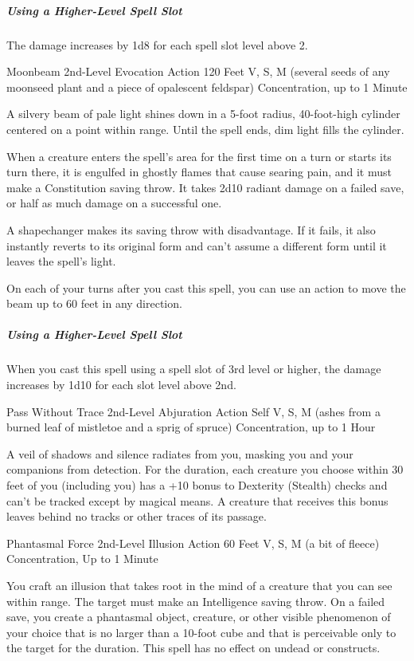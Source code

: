 \documentclass[letterpaper,openany,oneside,twocolumn]{book}
\begin{document}
\subparagraph*{Using a Higher-Level Spell Slot} The damage increases by 1d8 for each spell slot level above 2.
  
\DndSpellHeader
  {Moonbeam}
  {2nd-Level Evocation}
  {Action}
  {120 Feet}
  {V, S, M (several seeds of any moonseed plant and a piece of opalescent feldspar)}
  {Concentration, up to 1 Minute}

A silvery beam of pale light shines down in a 5-foot radius, 40-foot-high cylinder centered on a point within range. Until the spell ends, dim light fills the cylinder.

When a creature enters the spell's area for the first time on a turn or starts its turn there, it is engulfed in ghostly flames that cause searing pain, and it must make a Constitution saving throw. It takes 2d10 radiant damage on a failed save, or half as much damage on a successful one.

A shapechanger makes its saving throw with disadvantage. If it fails, it also instantly reverts to its original form and can't assume a different form until it leaves the spell's light.

On each of your turns after you cast this spell, you can use an action to move the beam up to 60 feet in any direction.

\subparagraph*{Using a Higher-Level Spell Slot} When you cast this spell using a spell slot of 3rd level or higher, the damage increases by 1d10 for each slot level above 2nd.

\DndSpellHeader
  {Pass Without Trace}
  {2nd-Level Abjuration}
  {Action}
  {Self}
  {V, S, M (ashes from a burned leaf of mistletoe and a sprig of spruce)}
  {Concentration, up to 1 Hour}

A veil of shadows and silence radiates from you, masking you and your companions from detection. For the duration, each creature you choose within 30 feet of you (including you) has a +10 bonus to Dexterity (Stealth) checks and can't be tracked except by magical means. A creature that receives this bonus leaves behind no tracks or other traces of its passage.

\DndSpellHeader
  {Phantasmal Force}
  {2nd-Level Illusion}
  {Action}
  {60 Feet}
  {V, S, M (a bit of fleece)}
  {Concentration, Up to 1 Minute}

You craft an illusion that takes root in the mind of a creature that you can see within range. The target must make an Intelligence saving throw. On a failed save, you create a phantasmal object, creature, or other visible phenomenon of your choice that is no larger than a 10-foot cube and that is perceivable only to the target for the duration. This spell has no effect on undead or constructs.
\end{document}
